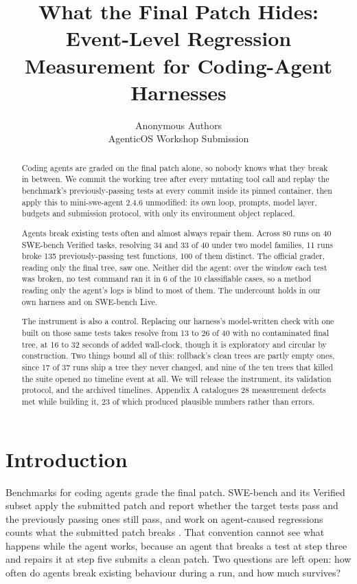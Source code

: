 \documentclass{article}
\title{What the Final Patch Hides:\\Event-Level Regression Measurement for Coding-Agent Harnesses}
\author{Anonymous Authors\\AgenticOS Workshop Submission}
\begin{document}
\maketitle
\begin{abstract}
Coding agents are graded on the final patch alone, so nobody knows what they break in between. We commit the working tree after every mutating tool call and replay the benchmark's previously-passing tests at every commit inside its pinned container, then apply this to mini-swe-agent 2.4.6 unmodified: its own loop, prompts, model layer, budgets and submission protocol, with only its environment object replaced.

Agents break existing tests often and almost always repair them. Across 80 runs on 40 SWE-bench Verified tasks, resolving 34 and 33 of 40 under two model families, 11 runs broke 135 previously-passing test functions, 100 of them distinct. The official grader, reading only the final tree, saw one. Neither did the agent: over the window each test was broken, no test command ran it in 6 of the 10 classifiable cases, so a method reading only the agent's logs is blind to most of them. The undercount holds in our own harness and on SWE-bench Live.

The instrument is also a control. Replacing our harness's model-written check with one built on those same tests takes resolve from 13 to 26 of 40 with no contaminated final tree, at 16 to 32 seconds of added wall-clock, though it is exploratory and circular by construction. Two things bound all of this: rollback's clean trees are partly empty ones, since 17 of 37 runs ship a tree they never changed, and nine of the ten trees that killed the suite opened no timeline event at all. We will release the instrument, its validation protocol, and the archived timelines. Appendix A catalogues 28 measurement defects met while building it, 23 of which produced plausible numbers rather than errors.
\end{abstract}

\section{Introduction}

Benchmarks for coding agents grade the final patch. SWE-bench \cite{ref1} and its Verified subset \cite{ref2} apply the submitted patch and report whether the target tests pass and the previously passing ones still pass, and work on agent-caused regressions counts what the submitted patch breaks \cite{ref8}. That convention cannot see what happens while the agent works, because an agent that breaks a test at step three and repairs it at step five submits a clean patch. Two questions are left open: how often do agents break existing behaviour during a run, and how much survives?
\end{document}

